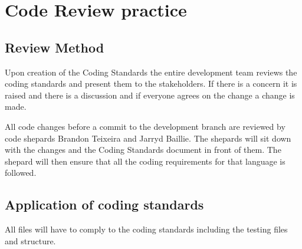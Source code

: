 \documentclass[11pt]{article}
\begin{document}
	\section{Code Review practice}
	\subsection{Review Method}
	Upon creation of the Coding Standards the entire development team reviews the coding standards and present them to the stakeholders. If there is a concern it is raised and there is a discussion and if everyone agrees on the change a change is made.
	
	All code changes before a commit to the development branch are reviewed by code shepards Brandon Teixeira and Jarryd Baillie. The shepards will sit down with the changes and the Coding Standards document in front of them. The shepard will then ensure that all the coding requirements for that language is followed.
	
	\subsection{Application of coding standards}
	All files will have to comply to the coding standards including the testing files and structure.
	
	
	

	
	
	
\end{document}
